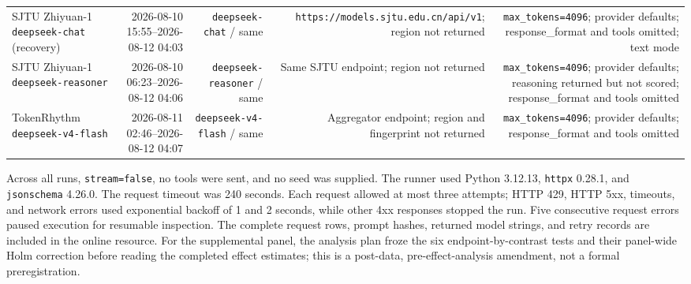 \documentclass[11pt,a4paper]{article}
\begin{document}
\begin{table}[t]
{\begin{tabular}{lrrrr}
SJTU Zhiyuan-1 \texttt{deepseek-chat} (recovery) & 2026-08-10 15:55--2026-08-12 04:03 & \texttt{deepseek-chat} / same & \texttt{https://\allowbreak{}models.s\allowbreak{}jtu.edu.\allowbreak{}cn/api/v\allowbreak{}1}; region not returned & \texttt{max\_tokens=4096}; provider defaults; response\_format and tools omitted; text mode \\
SJTU Zhiyuan-1 \texttt{deepseek-reasoner} & 2026-08-10 06:23--2026-08-12 04:06 & \texttt{deepseek-reasoner} / same & Same SJTU endpoint; region not returned & \texttt{max\_tokens=4096}; provider defaults; reasoning returned but not scored; response\_format and tools omitted \\
TokenRhythm \texttt{deepseek-v4-flash} & 2026-08-11 02:46--2026-08-12 04:07 & \texttt{deepseek-v4-flash} / same & Aggregator endpoint; region and fingerprint not returned & \texttt{max\_tokens=4096}; provider defaults; response\_format and tools omitted \\
\bottomrule
\end{tabular}%
}
\end{table}
Across all runs, \texttt{stream=false}, no tools were sent, and no seed was supplied. The runner used Python 3.12.13, \texttt{httpx} 0.28.1, and \texttt{jsonschema} 4.26.0. The request timeout was 240 seconds. Each request allowed at most three attempts; HTTP 429, HTTP 5xx, timeouts, and network errors used exponential backoff of 1 and 2 seconds, while other 4xx responses stopped the run. Five consecutive request errors paused execution for resumable inspection. The complete request rows, prompt hashes, returned model strings, and retry records are included in the online resource. For the supplemental panel, the analysis plan froze the six endpoint-by-contrast tests and their panel-wide Holm correction before reading the completed effect estimates; this is a post-data, pre-effect-analysis amendment, not a formal preregistration.
\end{document}
